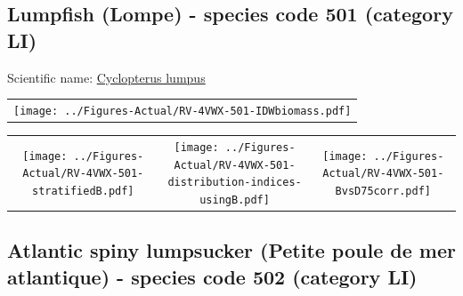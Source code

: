 \documentclass[12pt]{article}\usepackage[]{graphicx}\usepackage[]{color}
\begin{document}
\renewcommand\thefigure{\thesubsection\Alph{figure}}

\setcounter{figure}{0}

\hypertarget{sec:501}{%
\subsection{Lumpfish (Lompe) - species code 501 (category LI)}\label{sec:501}}

  


Scientific name: \href{http://www.marinespecies.org/aphia.php?p=taxdetails\&id=127214}{Cyclopterus lumpus} \newline
\begin{minipage}{1.0\textwidth}
 \begin{tabular}{c}
\texttt{[image: ../Figures-Actual/RV-4VWX-501-IDWbiomass.pdf]} \\ 
\end{tabular} 
\end{minipage}
\newline

\vspace{1cm}
\begin{minipage}{1.0\textwidth}
 \begin{tabular}{ccc}
\texttt{[image: ../Figures-Actual/RV-4VWX-501-stratifiedB.pdf]} & 
\texttt{[image: ../Figures-Actual/RV-4VWX-501-distribution-indices-usingB.pdf]} & 
\texttt{[image: ../Figures-Actual/RV-4VWX-501-BvsD75corr.pdf]} \\ 
\end{tabular} 
\end{minipage}
\clearpage

\renewcommand\thefigure{\thesubsection\Alph{figure}}

\setcounter{figure}{0}

\hypertarget{sec:502}{%
\subsection{Atlantic spiny lumpsucker (Petite poule de mer atlantique) - species code 502 (category LI)}\label{sec:502}}

  
\end{document}
